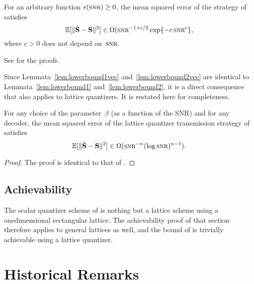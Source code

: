 \begin{lemma}
  \label{lem:lowerbound2vec}
  For an arbitrary function $\e(\snr) \ge 0$, the mean squared error of the
  strategy of  satisfies
  \begin{equation*}
    \msev \in \Omega(\snr^{-1 + \e/2} \exp\{- c \snr^\e \},
  \end{equation*}
  where $c > 0$ does not depend on~$\snr$.
\end{lemma}

See  for the proofs.

Since Lemmata~\ref{lem:lowerbound1vec} and~\ref{lem:lowerbound2vec} are
identical to Lemmata~\ref{lem:lowerbound1} and~\ref{lem:lowerbound2}, it is a
direct consequence that  also applies to lattice quantizers.
It is restated here for completeness.

\begin{theorem}
  \label{thm:scalinglbvec}
  For any choice of the parameter~$\beta$ (as a function of the SNR) and for any
  decoder, the mean squared error of the lattice quantizer transmission strategy
  of  satisfies
  \begin{equation*}
    \msev \in \Omega(\snr^{-n} (\log\snr)^{n-1}).
  \end{equation*}
\end{theorem}

\begin{proof}
  The proof is identical to that of .
\end{proof}


\subsection{Achievability}

The scalar quantizer scheme of  is nothing but a lattice
scheme using a onedimensional rectangular lattice. The achievability proof of
that section therefore applies to general lattices as well, and the bound of
 is trivially achievable using a lattice quantizer.





\section{Historical Remarks}

